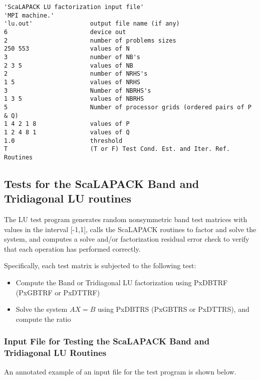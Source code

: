 \documentclass[11pt]{report}
\newcommand{\dent}{\hspace*{\parindent}}
\begin{document}
\begin{verbatim}
'ScaLAPACK LU factorization input file'
'MPI machine.'
'lu.out'                output file name (if any)
6                       device out
2                       number of problems sizes
250 553                 values of N
3                       number of NB's
2 3 5                   values of NB
2                       number of NRHS's
1 5                     values of NRHS
3                       Number of NBRHS's
1 3 5                   values of NBRHS
5                       Number of processor grids (ordered pairs of P & Q)
1 4 2 1 8               values of P
1 2 4 8 1               values of Q
1.0                     threshold
T                       (T or F) Test Cond. Est. and Iter. Ref. Routines
\end{verbatim}

\subsection{Tests for the ScaLAPACK Band and Tridiagonal LU routines}

The LU test program generates random nonsymmetric band test matrices with
values in the interval [-1,1], calls the ScaLAPACK 
routines to factor and solve the system, and computes a solve and/or 
factorization residual error check to verify that each operation has performed 
correctly.

Specifically, each test matrix is subjected to the following test:

\begin{itemize}
\item
Compute the Band or Tridiagonal LU factorization using PxDBTRF (PxGBTRF
or PxDTTRF)
\item Solve the system $A X = B$ using PxDBTRS (PxGBTRS or PxDTTRS), and
compute the ratio
\end{itemize}

\subsubsection{Input File for Testing the ScaLAPACK Band and Tridiagonal
LU Routines}
\dent
An annotated example of an input file for the
test program is shown below.
\end{document}
